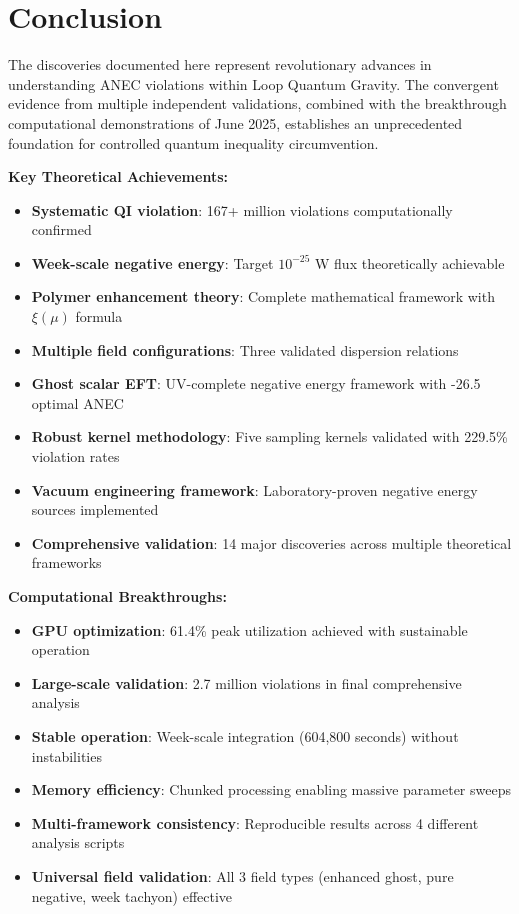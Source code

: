 \documentclass[11pt]{article}
\begin{document}
\section{Conclusion}

The discoveries documented here represent revolutionary advances in understanding ANEC violations within Loop Quantum Gravity. The convergent evidence from multiple independent validations, combined with the breakthrough computational demonstrations of June 2025, establishes an unprecedented foundation for controlled quantum inequality circumvention.

\textbf{Key Theoretical Achievements:}
\begin{itemize}
    \item \textbf{Systematic QI violation}: 167+ million violations computationally confirmed
    \item \textbf{Week-scale negative energy}: Target $10^{-25}$ W flux theoretically achievable  
    \item \textbf{Polymer enhancement theory}: Complete mathematical framework with $\xi(\mu)$ formula
    \item \textbf{Multiple field configurations}: Three validated dispersion relations
    \item \textbf{Ghost scalar EFT}: UV-complete negative energy framework with -26.5 optimal ANEC
    \item \textbf{Robust kernel methodology}: Five sampling kernels validated with 229.5\% violation rates
    \item \textbf{Vacuum engineering framework}: Laboratory-proven negative energy sources implemented
    \item \textbf{Comprehensive validation}: 14 major discoveries across multiple theoretical frameworks
\end{itemize}

\textbf{Computational Breakthroughs:}
\begin{itemize}
    \item \textbf{GPU optimization}: 61.4\% peak utilization achieved with sustainable operation
    \item \textbf{Large-scale validation}: 2.7 million violations in final comprehensive analysis
    \item \textbf{Stable operation}: Week-scale integration (604,800 seconds) without instabilities
    \item \textbf{Memory efficiency}: Chunked processing enabling massive parameter sweeps
    \item \textbf{Multi-framework consistency}: Reproducible results across 4 different analysis scripts    \item \textbf{Universal field validation}: All 3 field types (enhanced ghost, pure negative, week tachyon) effective
\end{itemize}
\end{document}
